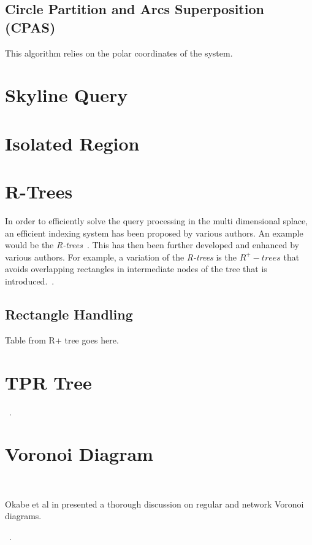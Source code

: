 \documentclass[a4paper,11pt]{article}
\begin{document}
\subsection{Circle Partition and Arcs Superposition (CPAS)}
This algorithm relies on the polar coordinates of the system.

\section{Skyline Query}


\section{Isolated Region}

\section{R-Trees}
In order to efficiently solve the query processing in the multi dimensional splace, an efficient indexing system has been proposed by various authors. An example would be the \textit{R-trees}~\cite{guttman1984r}. This has then been further developed and enhanced by various authors. For example, a variation of the \textit{R-trees} is the $R^+ -trees$ that avoids overlapping rectangles in intermediate nodes of the tree that is introduced.~\cite{beckmann1990r}.

\subsection{Rectangle Handling}
Table from R+ tree goes here.

\section{TPR\* Tree}
~\cite{tao2003tpr}.

\section{Voronoi Diagram}

~\cite{shahabi2003road}

Okabe et al in \cite{okabe2009spatial} presented a thorough discussion on regular and network Voronoi diagrams. 

~\cite{de2000computational}.

~\cite{du1999centroidal}

~\cite{aurenhammer1991voronoi}
\end{document}
